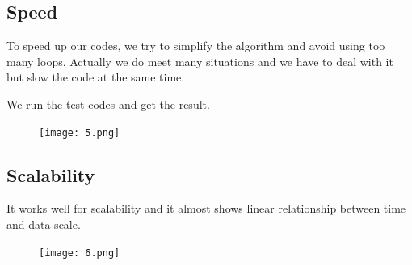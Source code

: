 \documentclass{article}
\begin{document}
\subsection{Speed}
To speed up our codes, we try to simplify the algorithm and avoid using too many loops. Actually we do meet many situations and we have to deal with it but slow the code at the same time.\newpage 
\begin{flushleft}
We run the test codes and get the result.
\end{flushleft}
\begin{figure}[ht]
    \centering
	\texttt{[image: 5.png]}
\end{figure}
\subsection{Scalability}
It works well for scalability and it almost shows linear relationship between time and data scale.
\begin{figure}[ht]
    \centering
	\texttt{[image: 6.png]}
\end{figure}
\end{document}
